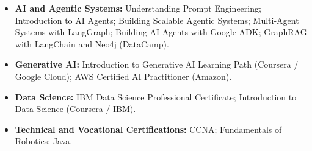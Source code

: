\documentclass[10pt,a4paper,sans]{moderncv}
\begin{document}
\begin{itemize}[leftmargin=0.35cm, label={\textbullet}, itemsep=0.3em, parsep=0pt]
    \item \textbf{AI and Agentic Systems:} Understanding Prompt Engineering; Introduction to AI Agents; Building Scalable Agentic Systems; Multi-Agent Systems with LangGraph; Building AI Agents with Google ADK; GraphRAG with LangChain and Neo4j (DataCamp).
    \item \textbf{Generative AI:} Introduction to Generative AI Learning Path (Coursera / Google Cloud); AWS Certified AI Practitioner (Amazon).
    \item \textbf{Data Science:} IBM Data Science Professional Certificate; Introduction to Data Science (Coursera / IBM).
    \item \textbf{Technical and Vocational Certifications:} CCNA; Fundamentals of Robotics; Java.
\end{itemize}
\end{document}
